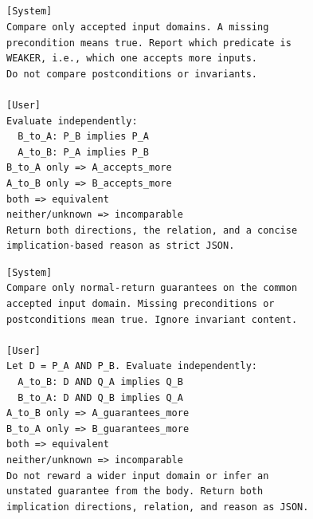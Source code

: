 \subsection{}
\label{app:prompt-strength-judge}


\par\medskip\noindent
\begin{minipage}[t]{\columnwidth}
\begin{tcolorbox}[promptboxcompact, title={\textcolor{white}{Precondition judge}}, width=\linewidth]
\begin{lstlisting}[style=PromptInnerCompact]
[System]
Compare only accepted input domains. A missing
precondition means true. Report which predicate is
WEAKER, i.e., which one accepts more inputs.
Do not compare postconditions or invariants.

[User]
Evaluate independently:
  B_to_A: P_B implies P_A
  A_to_B: P_A implies P_B
B_to_A only => A_accepts_more
A_to_B only => B_accepts_more
both => equivalent
neither/unknown => incomparable
Return both directions, the relation, and a concise
implication-based reason as strict JSON.
\end{lstlisting}
\end{tcolorbox}
\end{minipage}\par\medskip\noindent
\begin{minipage}[t]{\columnwidth}
\begin{tcolorbox}[promptboxcompact, title={\textcolor{white}{Postcondition judge}}, width=\linewidth]
\begin{lstlisting}[style=PromptInnerCompact]
[System]
Compare only normal-return guarantees on the common
accepted input domain. Missing preconditions or
postconditions mean true. Ignore invariant content.

[User]
Let D = P_A AND P_B. Evaluate independently:
  A_to_B: D AND Q_A implies Q_B
  B_to_A: D AND Q_B implies Q_A
A_to_B only => A_guarantees_more
B_to_A only => B_guarantees_more
both => equivalent
neither/unknown => incomparable
Do not reward a wider input domain or infer an
unstated guarantee from the body. Return both
implication directions, relation, and reason as JSON.
\end{lstlisting}
\end{tcolorbox}
\end{minipage}\par\medskip\noindent
